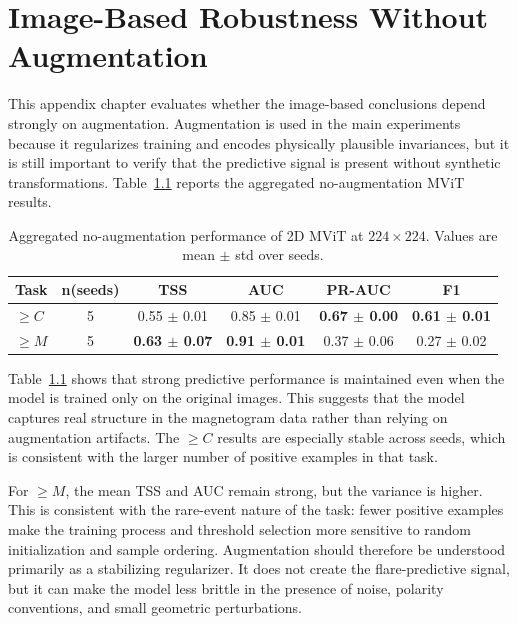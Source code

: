 \FloatBarrier

\chapter{Image-Based Robustness Without Augmentation}
\label{app:no_aug_2d_mvit}

This appendix chapter evaluates whether the image-based conclusions depend strongly on augmentation. Augmentation is used in the main experiments because it regularizes training and encodes physically plausible invariances, but it is still important to verify that the predictive signal is present without synthetic transformations. Table~\ref{tab:appendix_no_aug} reports the aggregated no-augmentation MViT results.

\begin{table}[!htbp]
\centering
\footnotesize
\caption{Aggregated no-augmentation performance of 2D MViT at $224\times224$. Values are mean $\pm$ std over seeds.}
\label{tab:appendix_no_aug}
\begin{tabular}{lccccc}
\toprule
Task & n(seeds) & TSS & AUC & PR-AUC & F1 \\
\midrule
$\geq C$ & 5 & 0.55 $\pm$ 0.01 & 0.85 $\pm$ 0.01 & \textbf{0.67 $\pm$ 0.00} & \textbf{0.61 $\pm$ 0.01} \\
$\geq M$ & 5 & \textbf{0.63 $\pm$ 0.07} & \textbf{0.91 $\pm$ 0.01} & 0.37 $\pm$ 0.06 & 0.27 $\pm$ 0.02 \\
\bottomrule
\end{tabular}
\end{table}

\FloatBarrier

Table~\ref{tab:appendix_no_aug} shows that strong predictive performance is maintained even when the model is trained only on the original images. This suggests that the model captures real structure in the magnetogram data rather than relying on augmentation artifacts. The $\geq C$ results are especially stable across seeds, which is consistent with the larger number of positive examples in that task.

For $\geq M$, the mean TSS and AUC remain strong, but the variance is higher. This is consistent with the rare-event nature of the task: fewer positive examples make the training process and threshold selection more sensitive to random initialization and sample ordering. Augmentation should therefore be understood primarily as a stabilizing regularizer. It does not create the flare-predictive signal, but it can make the model less brittle in the presence of noise, polarity conventions, and small geometric perturbations.

